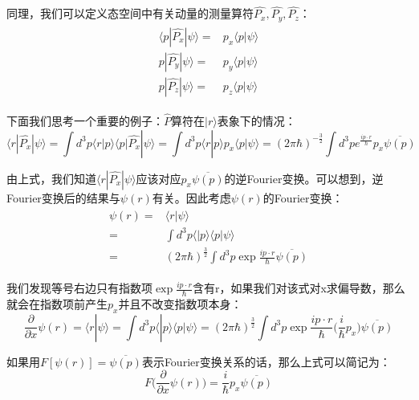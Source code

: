         同理，我们可以定义态空间中有关动量的测量算符$\hat{P_x},\hat{P_y},\hat{P_z}$：
        \begin{align}
            \begin{split}
                \langle p|\hat{P_x}|\psi\rangle=&p_x\langle p|\psi\rangle\\
                p|\hat{P_y}|\psi\rangle=&p_y\langle p|\psi\rangle\\
                p|\hat{P_z}|\psi\rangle=&p_z\langle p|\psi\rangle
            \end{split}
        \end{align}
        
        下面我们思考一个重要的例子：$\hat{P}$算符在$|r\rangle$表象下的情况：
        \begin{equation}
            \langle r|\hat{P_x}|\psi\rangle=\int d^3p\langle r|p\rangle\langle p|\hat{P_x}|\psi\rangle =\int d^3p\langle r|p\rangle p_x\langle p|\psi\rangle=(2\pi\hbar)^{-\frac{3}{2}}\int d^3p e^{\frac{ip\cdot r}{\hbar}}p_x\overline{\psi(p)}
        \end{equation}
        
        由上式，我们知道$\langle r|\hat{P_x}|\psi\rangle$应该对应$p_x\overline{\psi(p)}$的逆Fourier变换。可以想到，逆Fourier变换后的结果与$\psi(r)$有关。因此考虑$\psi(r)$的Fourier变换：
        \begin{align}
            \begin{split}
                \psi(r)=& \langle r|\psi\rangle\\
                =&\int d^3 p\langle|p\rangle\langle p|\psi\rangle\\
                =&(2\pi\hbar)^{\frac{3}{2}}\int d^3 p\exp{\frac{ip\cdot r}{\hbar}}\overline{\psi(p)}
            \end{split}
        \end{align}
            

        我们发现等号右边只有指数项$\exp{\frac{ip\cdot r}{\hbar}}$含有r，如果我们对该式对x求偏导数，那么就会在指数项前产生$p_x$并且不改变指数项本身：
        \begin{equation}
            \frac{\partial}{\partial x}\psi(r)= \langle r|\psi\rangle=\int d^3 p\langle|p\rangle\langle p|\psi\rangle =(2\pi\hbar)^{\frac{3}{2}}\int d^3 p\exp{\frac{ip\cdot r}{\hbar}}\Big(\frac{i}{\hbar}p_x\Big)\overline{\psi(p)}
        \end{equation}
        
        如果用$F[\psi(r)]=\overline{\psi(p)}$表示Fourier变换关系的话，那么上式可以简记为：
        \begin{equation}
            F\Big(\frac{\partial}{\partial x}\psi(r)\Big)=\frac{i}{\hbar}p_x\overline{\psi(p)}
        \end{equation}
        

